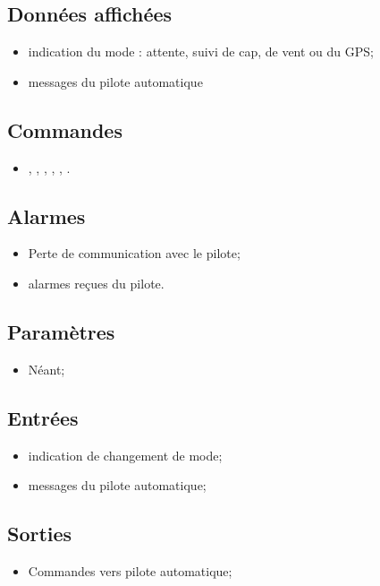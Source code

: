 \documentclass[a4paper,11pt]{report}
\begin{document}
\subsection{Données affichées}
\begin{itemize}
	\item indication du mode : attente, suivi de cap, de vent ou du GPS;
	\item messages du pilote automatique
\end{itemize}

\subsection{Commandes}
\begin{itemize}
	\item {}, , , ,
	, .
\end{itemize}

\subsection{Alarmes}
\begin{itemize}
	\item Perte de communication avec le pilote;
	\item alarmes reçues du pilote.
\end{itemize}

\subsection{Paramètres}
\begin{itemize}
	\item Néant;
\end{itemize}

\subsection{Entrées}
\begin{itemize}
	\item indication de changement de mode;
	\item messages du pilote automatique;
\end{itemize}

\subsection{Sorties}
\begin{itemize}
	\item Commandes vers pilote automatique;
\end{itemize}
\end{document}
